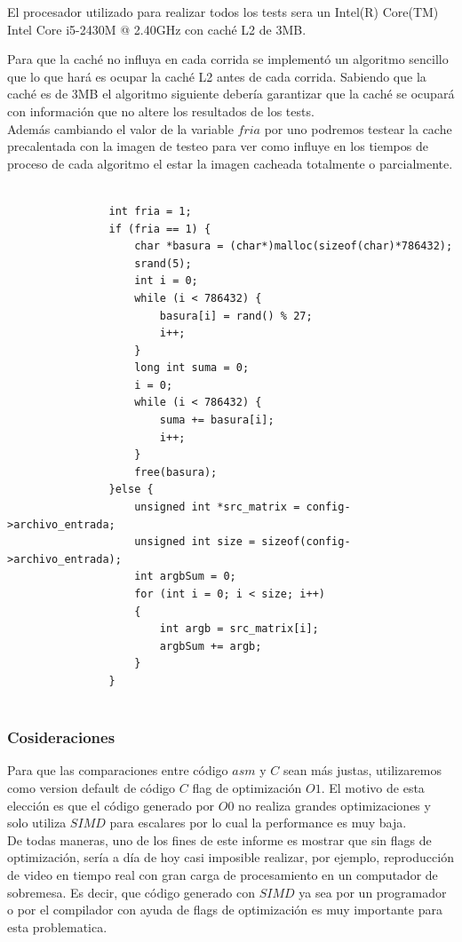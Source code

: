 El procesador utilizado para realizar todos los tests sera un Intel(R) Core(TM) Intel Core i5-2430M @ 2.40GHz con caché L2 de 3MB.

Para que la caché no influya en cada corrida se implementó un algoritmo sencillo que lo que hará es ocupar la caché L2 antes de cada corrida. Sabiendo que la caché es de 3MB el algoritmo siguiente debería garantizar que la caché se ocupará con información que no altere los resultados de los tests. \\
Además cambiando el valor de la variable $fria$ por uno podremos testear la cache precalentada con la imagen de testeo para ver como influye en los tiempos de proceso de cada algoritmo el estar la imagen cacheada totalmente o parcialmente.

\begin{codesnippet}
\begin{verbatim}
                
  				int fria = 1;
				if (fria == 1) {
					char *basura = (char*)malloc(sizeof(char)*786432);
					srand(5);
					int i = 0;
					while (i < 786432) {
						basura[i] = rand() % 27;            
						i++;                
					}
					long int suma = 0;
					i = 0;                
					while (i < 786432) {
						suma += basura[i];   
						i++;         
					}
					free(basura);
				}else {
					unsigned int *src_matrix = config->archivo_entrada;
					unsigned int size = sizeof(config->archivo_entrada);
					int argbSum = 0;
					for (int i = 0; i < size; i++)
					{
						int argb = src_matrix[i];
						argbSum += argb;
					}
				}
                
\end{verbatim}
\end{codesnippet}

\pagebreak

\subsubsection{Cosideraciones}

Para que las comparaciones entre código $asm$ y $C$ sean más justas, utilizaremos como version default de código $C$ flag de optimización $O1$. El motivo de esta elección es que el código generado por $O0$ no realiza grandes optimizaciones y solo utiliza $SIMD$ para escalares por lo cual la performance es muy baja. \\

De todas maneras, uno de los fines de este informe es mostrar que sin flags de optimización, sería a día de hoy casi imposible realizar, por ejemplo, reproducción de video en tiempo real con gran carga de procesamiento en un computador de sobremesa. Es decir, que código generado con $SIMD$ ya sea por un programador o por el compilador con ayuda de flags de optimización es muy importante para esta problematica.\\

